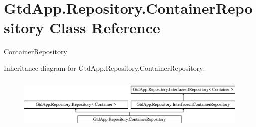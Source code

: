 \hypertarget{class_gtd_app_1_1_repository_1_1_container_repository}{}\section{Gtd\+App.\+Repository.\+Container\+Repository Class Reference}
\label{class_gtd_app_1_1_repository_1_1_container_repository}


\mbox{\hyperlink{class_gtd_app_1_1_repository_1_1_container_repository}{Container\+Repository}}  


Inheritance diagram for Gtd\+App.\+Repository.\+Container\+Repository\+:\begin{figure}[H]
\begin{center}
\leavevmode
\includegraphics[height=2.530120cm]{class_gtd_app_1_1_repository_1_1_container_repository}
\end{center}
\end{figure}
